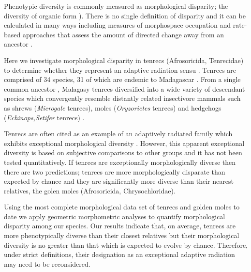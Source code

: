 \documentclass[12pt,a4paper]{article}
\begin{document}
Phenotypic diversity is commonly measured as morphological disparity; the diversity of organic form \citep{Foote1997,Erwin2007}). There is no single definition of disparity and it can be calculated in many ways including measures of morphospace occupation \citep[e.g.][]{Goswami2011, Brusatte2008} and rate-based approaches that assess the amount of directed change away from an ancestor \citep{OMeara2006, Price2013}.



Here we investigate morphological disparity in tenrecs (Afrosoricida, Tenrecidae) to determine whether they represent an adaptive radiation sensu \citep{Losos2010a}. Tenrecs are comprised of 34 species, 31 of which are endemic to Madagascar \citep{Olson2013}. From a single common ancestor \citep{Asher2006}, Malagasy tenrecs diversified into a wide variety of descendant species which convergently resemble distantly related insectivore mammals such as shrews (\textit{Microgale} tenrecs), moles (\textit{Oryzorictes} tenrecs) and hedgehogs (\textit{Echinops,Setifer} tenrecs) \citep{Eisenberg1969}.

Tenrecs are often cited as an example of an adaptively radiated family which exhibits exceptional morphological diversity \citep{Soarimalala2011, Olson2003, Eisenberg1969}. However, this apparent exceptional diversity is based on subjective comparisons to other groups and it has not been tested quantitatively. If tenrecs are exceptionally morphologically diverse then there are two predictions; tenrecs are more morphologically disparate than expected by chance and they are significantly more diverse than their nearest relatives, the golen moles (Afrosoricida, Chrysochloridae).



Using the most complete morphological data set of tenrecs and golden moles to date  we apply geometric morphometric analyses \citep{Rohlf1993, Zelditch2012} to quantify morphological disparity among our species. Our results indicate that, on average, tenrecs are more phenotypically diverse than their closest relatives but their morphological diversity is no greater than that which is expected to evolve by chance. Therefore, under strict definitions, their designation as an exceptional adaptive radiation may need to be reconsidered. 
\end{document}
